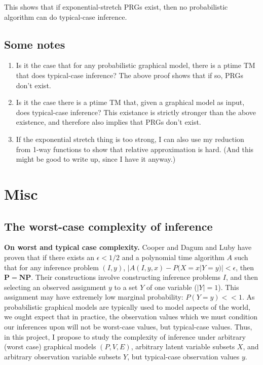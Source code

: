 \documentclass{article}
\renewcommand{\P}{\mathbf{P}}
\newcommand{\NP}{\mathbf{NP}}
\theoremstyle{definition}
\theoremstyle{remark}
\begin{document}
This shows that if exponential-stretch PRGs exist, then no probabilistic algorithm can do typical-case inference.

\subsection{Some notes}
\begin{enumerate}
    \item Is it the case that for any probabilistic graphical model, there is a ptime TM that does typical-case inference?  The above proof shows that if so, PRGs don't exist.
    \item Is it the case there is a ptime TM that, given a graphical model as input, does typical-case inference?  This existance is strictly stronger than the above existence, and therefore also implies that PRGs don't exist.
    \item If the exponential stretch thing is too strong, I can also use my reduction from 1-way functions to show that relative approximation is hard.  (And this might be good to write up, since I have it anyway.)
\end{enumerate}

\newpage
\section{Misc}
\subsection{The worst-case complexity of inference}

\textbf{On worst and typical case complexity.} Cooper \cite{cooper1990} and Dagum and Luby \cite{dagum1993} have proven that if there exists an $\epsilon < 1/2$ and a polynomial time algorithm $A$ such that for any inference problem $(I, y)$, $|A(I, y, x) - P(X = x | Y = y)| < \epsilon$, then $\P = \NP$.
Their constructions involve constructing inference problems $I$, and then selecting an observed assignment $y$ to a set $Y$ of one variable ($|Y| = 1$).
This assignment may have extremely low marginal probability: $P(Y = y) << 1$.
As probabilistic graphical models are typically used to model aspects of the world, we ought expect that in practice, the observation values which we must condition our inferences upon will not be worst-case values, but typical-case values.
Thus, in this project, I propose to study the complexity of inference under arbitrary (worst case) graphical models $(P, V, E)$, arbitrary latent variable subsets $X$, and arbitrary observation variable subsets $Y$, but typical-case observation values $y$.
\end{document}

